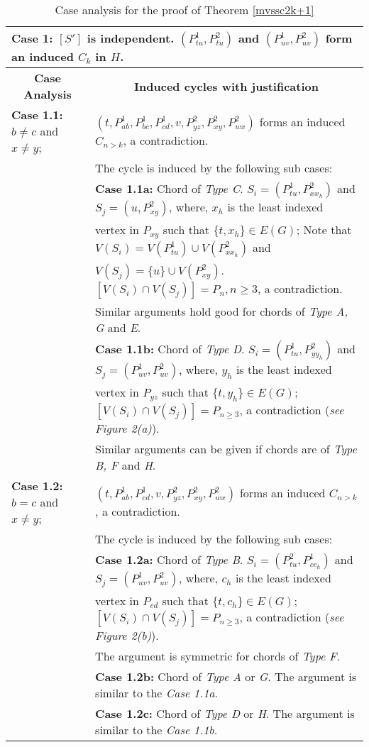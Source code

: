 \documentclass[runningheads]{llncs}
\begin{document}
\begin{table}[H]
\caption{Case analysis for the proof of Theorem \ref{mvssc2k+1}}
\label{table:table1}
\begin{tabular}{|l|l|}
\multicolumn{2}{l}{\textbf{Case 1:}  $[S']$ is independent. $(P_{tu}^{1},P_{tu}^2)$ and $(P_{uv}^{1}, P_{uv}^2)$ form an induced $C_k$ in $H$.}\\ \hline

\multicolumn{1}{|c|}{\textbf{Case Analysis}} & \multicolumn{1}{|c|}{\textbf{Induced cycles with justification}}\\  \hline 
\textbf{Case 1.1:} $b \neq c$ and $x \neq y$; &  $(t, P_{ab}^{1}, P_{bc}^{1}, P_{cd}^{1}, v, P_{yz}^{2}, P_{xy}^{2}, P_{wx}^{2})$ forms an induced $C_{n >k}$, a contradiction. \\ 
& 	The cycle is induced by the following sub cases:\\ \cline{2-2} 
&\textbf{Case 1.1a:} Chord of \emph{Type C}. $S_i=(P_{tu}^{1}, P_{xx_h}^{2})$ and $S_j = (u,P_{xy}^{2})$, where, $x_h$ is the least indexed \\
& vertex in $P_{xy}$ such that $\{t,x_h\} \in E(G)$; Note that $V(S_i) = V(P_{tu}^{1}) \cup V(P_{xx_h}^{2})$ and \\
& $V(S_j) = \{u\} \cup V(P_{xy}^{2})$. $[V(S_i)\cap V(S_j)] = P_n, n \geq 3$, a contradiction. \\ 
&	Similar arguments hold good for chords of \emph{Type A, G} and \emph{E}. \\ \cline{2-2}
&\textbf{Case 1.1b:} Chord of \emph{Type D}. $S_i=(P_{tu}^{1}, P_{yy_h}^{2})$ and $S_j = (P_{uv}^{1},P_{uv}^{2})$, where, $y_h$ is the least indexed \\
&  vertex in $P_{yz}$ such that $\{t,y_h\} \in E(G)$; $[V(S_i)\cap V(S_j)] = P_{n \geq 3}$, a contradiction (\emph{see Figure 2(a)}). \\ 
&	Similar arguments can be given if chords are of \emph{Type B, F} and \emph{H}.\\
\hline
\textbf{Case 1.2:} $b = c$ and $x \neq y$; & $(t, P_{ab}^{1}, P_{cd}^{1}, v, P_{yz}^{2}, P_{xy}^{2}, P_{wx}^{2})$ forms an induced $C_{n >k}$, a contradiction. \\ 
& The cycle is induced by the following sub cases:\\ \cline{2-2}

&	\textbf{Case 1.2a:} Chord of \emph{Type B}. $S_i=(P_{tu}^{2}, P_{cc_h}^{1})$ and $S_j = (P_{uv}^{1},P_{uv}^{2})$, where, $c_h$ is the least indexed \\
&	vertex in $P_{cd}$ such that $\{t,c_h\} \in E(G)$; $[V(S_i)\cap V(S_j)] = P_{n \geq 3}$, a contradiction (\emph{see Figure 2(b)}).  \\ 
&	The argument is symmetric for chords of \emph{Type F}.\\ \cline{2-2}
& \textbf{Case 1.2b:} Chord of \emph{Type A} or \emph{G}.  The argument is similar to the \emph{Case 1.1a}. \\ \cline{2-2}
& \textbf{Case 1.2c:} Chord of \emph{Type D} or \emph{H}. The argument is similar to the \emph{Case 1.1b}. \\  \hline


\end{tabular}
\end{table}
\end{document}
